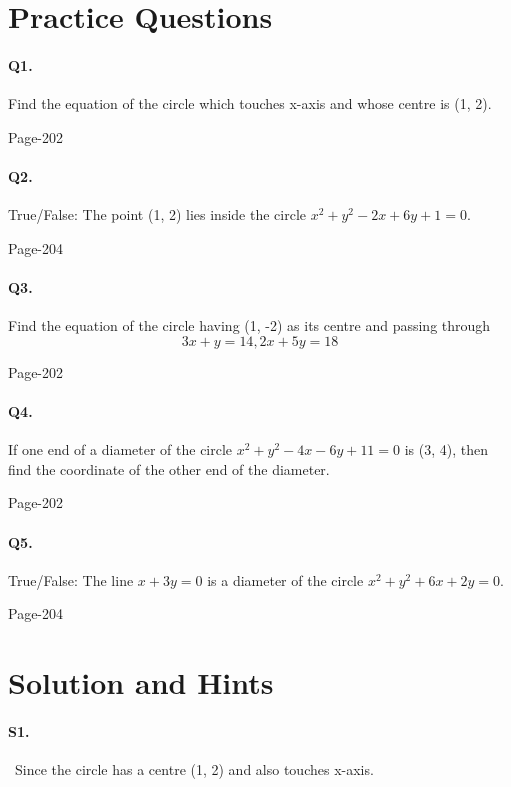 \documentclass{article}
\begin{document}
\section*{Practice Questions}
\paragraph{Q1.}Find the equation of the circle which touches x-axis and whose centre is (1, 2).
\begin{flushright}
Page-202
\end{flushright}
\paragraph{Q2.}True/False: The point (1, 2) lies inside the circle $x^2 + y^2 - 2x + 6y + 1 = 0$.
\begin{flushright}
    Page-204
\end{flushright}
\paragraph{Q3.}Find the equation of the circle having (1, -2) as its centre and passing through $$3x + y = 14, 2x + 5y = 18$$
\begin{flushright}
    Page-202
\end{flushright}
\paragraph{Q4.}If one end of a diameter of the circle $x^2 + y^2 - 4x - 6y + 11 = 0$ is (3, 4), then find
the coordinate of the other end of the diameter.
\begin{flushright}
    Page-202
\end{flushright}
\paragraph{Q5.}True/False: The line $x + 3y = 0$ is a diameter of the circle $x^2 + y^2 + 6x + 2y = 0$.
\begin{flushright}
    Page-204
\end{flushright}
\clearpage


\section*{Solution and Hints}
\paragraph{S1.}\
Since the circle has a centre (1, 2) and also touches x-axis.
\end{document}
